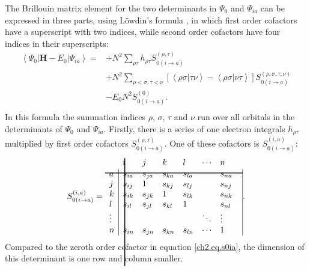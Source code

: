 The Brillouin matrix element for the two determinants in $\Psi_0$ and $\Psi_{ia}$ can be expressed in three parts, using L\"{o}wdin's formula \cite{lowdin}, in which first order cofactors have a superscript with two indices, while second order cofactors have four indices in their superscripts:
\begin{equation}
\begin{split}
\left < \Psi_0 | \mathbf{H} - E_0 | \Psi_{ia} \right>= & + N^2 \sum_{\rho\tau} h_{\rho\tau} S_{0(i\rightarrow a)}^{(\rho,\tau)} \\
& + N^2 \sum_{\rho<\sigma,\tau<\nu} [\left <\rho\sigma|\tau\nu \right > - \left < \rho\sigma | \nu\tau \right> ]  S_{0(i\rightarrow a)}^{(\rho,\sigma,\tau,\nu)} \\
&  - E_0 N^2 S_{0(i\rightarrow a)}^{(0)}.\\
\end{split}
\label{ch2.eq.lowdin}
\end{equation}
In this formula the summation indices $\rho$, $\sigma$, $\tau$ and $\nu$ run over all orbitals in the determinants of $\Psi_0$ and $\Psi_{ia}$. Firstly, there is a series of one electron integrals $h_{\rho\tau}$ multiplied by first order cofactors $S_{0(i\rightarrow a)}^{(\rho,\tau)}$. One of these cofactors is $S_{0(i\rightarrow a)}^{(i,a)}$:
\begin{equation}
S_{0(i\rightarrow a)}^{(i,a)} =
\begin{array}{lllllll}
 &  \hskip 2.0 pt \hbox{\lower 120pt\hbox{\vrule height128pt width 1.0pt}}\hskip-3.0pt i & j & k & l & \cdots & n \\
\noalign{\vskip-115pt}
 a &  \multicolumn{1}{|l}{s_{ia}} & s_{ja}  & s_{ka} & s_{la} & & \multicolumn{1}{l|}{ s_{na} } \\
\noalign{\vskip-8pt}
\multispan7\hbox{\vrule  height 1.0 pt width164pt}\cr
\noalign{\vskip 7pt}
  j & \multicolumn{1}{|l}{s_{ij}} & 1 & s_{kj} & s_{lj} & & \multicolumn{1}{l|}{s_{nj}} \\
 k & \multicolumn{1}{|l}{s_{ik}} & s_{jk} & 1 & s_{lk} & & \multicolumn{1}{l|}{s_{nk}} \\
 l & \multicolumn{1}{|l}{s_{il}} & s_{jl} & s_{kl} & 1 & & \multicolumn{1}{l|}{s_{nl}} \\
 \vdots & \multicolumn{1}{|l}{ } &   &   & & \ddots & \multicolumn{1}{l|}{\vdots} \\
 n & \multicolumn{1}{|l}{ s_{in}} & s_{jn} & s_{kn} & s_{ln} & \cdots & \multicolumn{1}{l|}{1}
\end{array}.\\
\label{ch2.eq.examfoco}
\end{equation}
Compared to the zeroth order cofactor in equation \ref{ch2.eq.s0ia}, the dimension of this determinant is one row and column smaller. 

